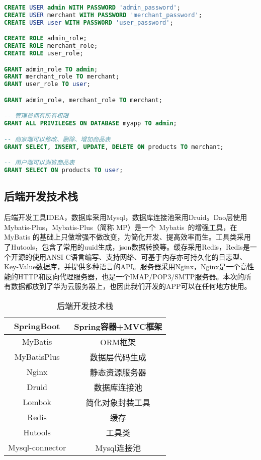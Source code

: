 \documentclass[lang=cn,a4paper,chinesefont=founder,bibend=bibtex]{shu-lab-report}
\begin{document}
\begin{lstlisting}[language=SQL]
CREATE USER admin WITH PASSWORD 'admin_password';
CREATE USER merchant WITH PASSWORD 'merchant_password';
CREATE USER user WITH PASSWORD 'user_password';

CREATE ROLE admin_role;
CREATE ROLE merchant_role;
CREATE ROLE user_role;

GRANT admin_role TO admin;
GRANT merchant_role TO merchant;
GRANT user_role TO user;

GRANT admin_role, merchant_role TO merchant;

-- 管理员拥有所有权限
GRANT ALL PRIVILEGES ON DATABASE myapp TO admin;

-- 商家端可以修改、删除、增加商品表
GRANT SELECT, INSERT, UPDATE, DELETE ON products TO merchant;

-- 用户端可以浏览商品表
GRANT SELECT ON products TO user;
\end{lstlisting}


\subsection{后端开发技术栈}

后端开发工具IDEA，数据库采用Mysql，数据库连接池采用Druid。Dao层使用Mybatis-Plus，Mybatis-Plus（简称 MP）是一个 Mybatis 的增强工具，在 MyBatis 的基础上只做增强不做改变，为简化开发、提高效率而生。工具类采用了Hutools，包含了常用的uuid生成，json数据转换等。缓存采用Redis，Redis是一个开源的使用ANSI C语言编写、支持网络、可基于内存亦可持久化的日志型、Key-Value数据库，并提供多种语言的API。服务器采用Nginx，Nginx是一个高性能的HTTP和反向代理服务器，也是一个IMAP/POP3/SMTP服务器。本次的所有数据都放到了华为云服务器上，也因此我们开发的APP可以在任何地方使用。

\begin{longtable}[c]{|c|c|}
  \caption{后端开发技术栈}
  \label{tab:1}                    \\
  \hline
  SpringBoot      & Spring容器+MVC框架 \\ \hline
  \endhead
  MyBatis         & ORM框架          \\ \hline
  MyBatisPlus     & 数据层代码生成        \\ \hline
  Nginx           & 静态资源服务器        \\ \hline
  Druid           & 数据库连接池         \\ \hline
  Lombok          & 简化对象封装工具       \\ \hline
  Redis           & 缓存             \\ \hline
  Hutools         & 工具类            \\ \hline
  Mysql-connector & Mysql连接池       \\ \hline
\end{longtable}
\end{document}
